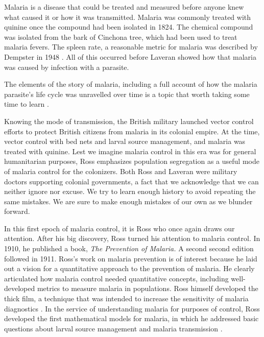 \documentclass[
]{book}
\begin{document}
Malaria is a disease that could be treated and measured before anyone knew what caused it or how it was transmitted.
Malaria was commonly treated with quinine once the compound had been isolated in 1824.
The chemical compound was isolated from the bark of Cinchona tree, which had been used to treat malaria fevers.
The spleen rate, a reasonable metric for malaria was described by Dempster in 1948 \autocite{Dempster1848SpleenRate}.
All of this occurred before Laveran showed how that malaria was caused by infection with a parasite.

The elements of the story of malaria, including a full account of
how the malaria parasite's life cycle was unravelled over time is a topic that worth taking some time to learn \autocite{Bruce-ChwattLJ1988HistoryMalaria,GarnhamPCC1988HistoryDiscoveries,ServiceMW1978ShortHistory,CoxFEG2010HistoryDiscovery}.

Knowing the mode of transmission, the British military launched vector control efforts to protect British citizens from malaria in its colonial empire.
At the time, vector control with bed nets and larval source management, and malaria was treated with quinine.
Lest we imagine malaria control in this era was for general humanitarian purposes, Ross emphasizes population segregation as a useful mode of malaria control for the colonizers.
Both Ross and Laveran were military doctors supporting colonial governments, a fact that we acknowledge that we can neither ignore nor excuse.
We try to learn enough history to avoid repeating the same mistakes.
We are sure to make enough mistakes of our own as we blunder forward.

In this first epoch of malaria control, it is Ross who once again draws our attention.
After his big discovery, Ross turned his attention to malaria control. In 1910,
he published a book, \emph{The Prevention of Malaria.} A second second edition followed in 1911.
Ross's work on malaria prevention is of interest because he laid out a vision for a quantitative approach to the prevention of malaria.
He clearly articulated how malaria control needed quantitative concepts, including well-developed metrics to measure malaria in populations.
Ross himself developed the thick film, a technique that was intended to increase the sensitivity of malaria diagnostics \autocite{RossR1903ThickFilm,RossR1903ImprovedMethod}.
In the service of understanding malaria for purposes of control, Ross developed the first mathematical models for malaria, in which he addressed basic questions about larval source management \autocite{RossR1905LogicalBasis} and malaria transmission \autocite{RossR1908,RossR1911Book,RossR1911Nature}.
\end{document}

